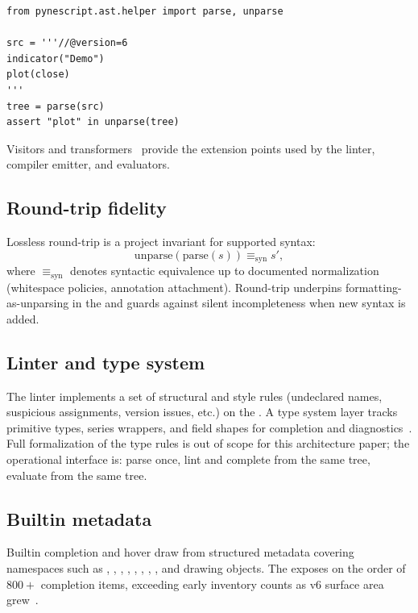 \documentclass[11pt,a4paper]{article}
\begin{document}
\begin{lstlisting}[style=python,caption={Parse and unparse round-trip (Python API).},label={lst:roundtrip}]
from pynescript.ast.helper import parse, unparse

src = '''//@version=6
indicator("Demo")
plot(close)
'''
tree = parse(src)
assert "plot" in unparse(tree)
\end{lstlisting}

Visitors and transformers~\citep{gamma1994design,gamma-visitor} provide the
extension points used by the linter, compiler emitter, and evaluators.

\subsection{Round-trip fidelity}
\label{sec:roundtrip}

Lossless round-trip is a project invariant for supported syntax:
\begin{equation}
  \mathrm{unparse}(\mathrm{parse}(s)) \equiv_{\mathrm{syn}} s',
  \label{eq:roundtrip}
\end{equation}
where $\equiv_{\mathrm{syn}}$ denotes syntactic equivalence up to documented
normalization (whitespace policies, annotation attachment).
Round-trip underpins formatting-as-unparsing in the \lsp{} and guards against
silent \ast{} incompleteness when new syntax is added.

\subsection{Linter and type system}
\label{sec:linter}

The linter implements a set of structural and style rules (undeclared names,
suspicious assignments, version issues, etc.) on the \ast{}.
A type system layer tracks primitive types, series wrappers, and \udt{} field
shapes for completion and diagnostics~\citep{pierce2002types,cardelli1996type}.
Full formalization of the type rules is out of scope for this architecture
paper; the operational interface is: parse once, lint and complete from the
same tree, evaluate from the same tree.

\subsection{Builtin metadata}
\label{sec:builtins}

Builtin completion and hover draw from structured metadata covering namespaces
such as \ta{}, , , , ,
, , , and drawing objects.
The \lsp{} exposes on the order of $800+$ completion items, exceeding early
inventory counts as v6 surface area grew~\citep{pynescript2026}.
\end{document}
